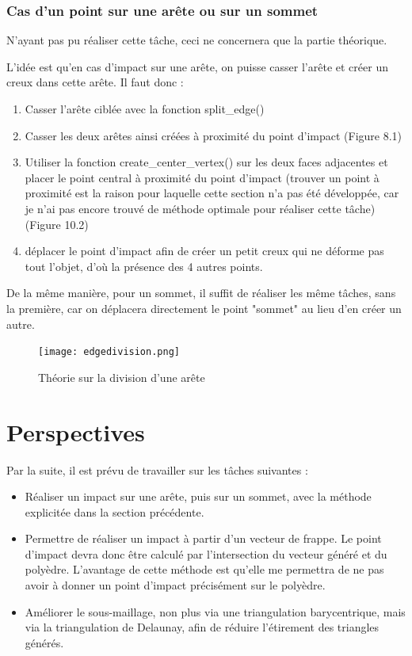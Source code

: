 \documentclass[a4paper,french]{report}
\begin{document}
			\subsection{Cas d'un point sur une arête ou sur un sommet}
				N'ayant pas pu réaliser cette tâche, ceci ne concernera que la partie théorique. \par 
				L'idée est qu'en cas d'impact sur une arête, on puisse casser l'arête et créer un creux dans cette arête. Il faut donc :
				\begin{enumerate}
					\item Casser l'arête ciblée avec la fonction split\_edge()
					\item Casser les deux arêtes ainsi créées à proximité du point d'impact (Figure 8.1)
					\item Utiliser la fonction create\_center\_vertex() sur les deux faces adjacentes et placer le point central à proximité du point d'impact (trouver un point à proximité est la raison pour laquelle cette section n'a pas été développée, car je n'ai pas encore trouvé de méthode optimale pour réaliser cette tâche) (Figure 10.2)
					\item déplacer le point d'impact afin de créer un petit creux qui ne déforme pas tout l'objet, d'où la présence des 4 autres points.
				\end{enumerate}
				De la même manière, pour un sommet, il suffit de réaliser les même tâches, sans la première, car on déplacera directement le point "sommet" au lieu d'en créer un autre.
				\begin{figure}[h]
					\centering
					\texttt{[image: edgedivision.png]}
					\caption{Théorie sur la division d'une arête}
				\end{figure}
	\chapter{Perspectives}
		Par la suite, il est prévu de travailler sur les tâches suivantes : 
		\begin{itemize}
			\item Réaliser un impact sur une arête, puis sur un sommet, avec la méthode explicitée dans la section précédente.
			\item Permettre de réaliser un impact à partir d'un vecteur de frappe. Le point d'impact devra donc être calculé par l'intersection du vecteur généré et du polyèdre. L'avantage de cette méthode est qu'elle me permettra de ne pas avoir à donner un point d'impact précisément sur le polyèdre.
			\item Améliorer le sous-maillage, non plus via une triangulation barycentrique, mais via la triangulation de Delaunay, afin de réduire l'étirement des triangles générés.
		\end{itemize}
		
\end{document}
